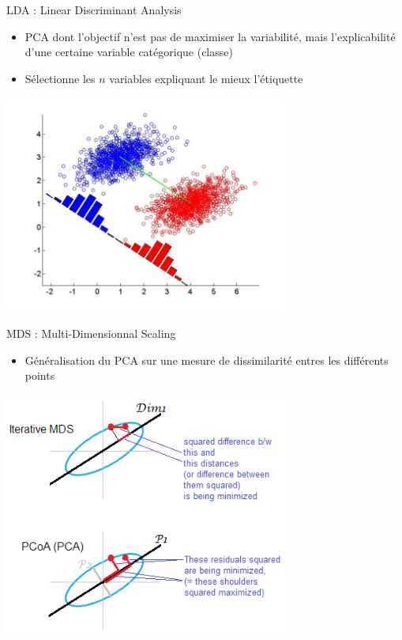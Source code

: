 \documentclass[french]{beamer}
\begin{document}
\begin{frame}{LDA : Linear Discriminant Analysis}
\begin{itemize}
	\item PCA dont l'objectif n'est pas de maximiser la variabilité, mais l'explicabilité d'une certaine variable catégorique (classe)
	\item Sélectionne les $n$ variables expliquant le mieux l'étiquette
\end{itemize}
\begin{center}
\includegraphics[width=0.7\textwidth]{lda}
\end{center}
\end{frame}


\begin{frame}{MDS : Multi-Dimensionnal Scaling}
\begin{itemize}
	\item Généralisation du PCA sur  une mesure de dissimilarité entres les différents points
\end{itemize}
\begin{center}
	\includegraphics[width=0.7\textwidth]{mds}
\end{center}
\end{frame}
\end{document}
